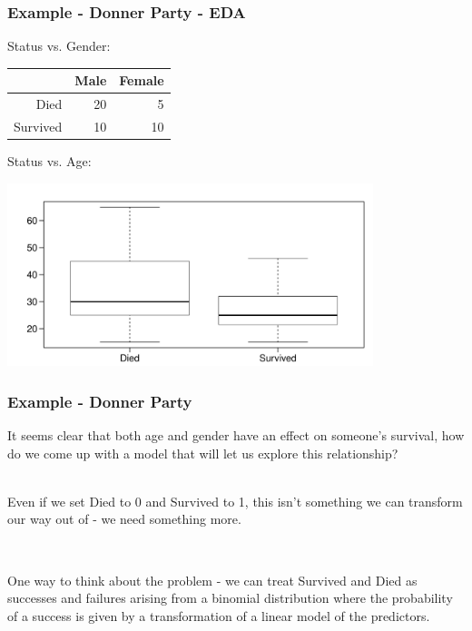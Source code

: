 \begin{frame}
\frametitle{Example - Donner Party - EDA}

Status vs. Gender:\\

\begin{center}
\begin{tabular}{rrr}
\hline
         & Male & Female \\ 
\hline
Died     &  20  &   5 \\ 
Survived &  10  &  10 \\ 
   \hline
\end{tabular}
\end{center}

\pause 
\vfill

Status vs. Age:\\
\begin{center}
\includegraphics[width=0.8\textwidth]{8-4_logistic_reg/figures/donner/status_age}
\end{center}

\end{frame}


\begin{frame}
\frametitle{Example - Donner Party}

It seems clear that both age and gender have an effect on someone's survival, how do we come up with a model that will let us explore this relationship?\\

~\\ \pause

Even if we set Died to 0 and Survived to 1, this isn't something we can transform our way out of - we need something more.

~\\ \pause

One way to think about the problem - we can treat Survived and Died as successes and failures arising from a binomial distribution where the probability of a success is given by a transformation of a linear model of the predictors.

\end{frame}

